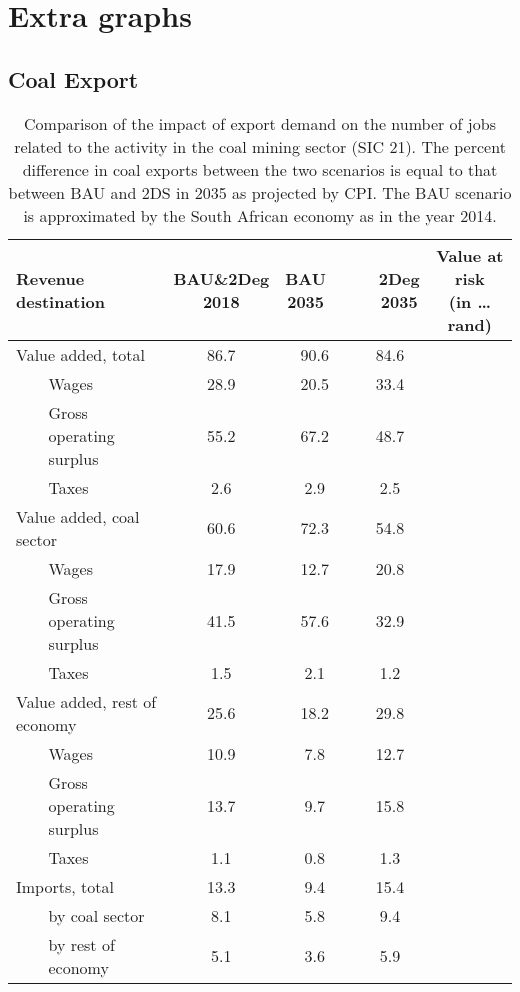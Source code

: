 \documentclass[12pt,english]{article}
\begin{document}
\section{Extra graphs}

\subsection{Coal Export}\label{coal export}

\begin{table}[ht]
	\centering
	\renewcommand*{\arraystretch}{1.15}
	\begin{tabular}{lp{20pt}lcccc}
		\toprule
		\multicolumn{3}{l}{Revenue destination } & \makecell{BAU\&2Deg \\2018} & \makecell{BAU\ \  \\ 2035\ \ } & \makecell{\ \ 2Deg \\\ \ 2035} & \makecell{Value at risk \\(in \ldots rand)}\\ 
		\midrule
		\multicolumn{3}{l}{Value added, total}   & 86.7  & 90.6 & 84.6 & \\ 	
		& 						 & Wages & 28.9 & 20.5  & 33.4 \\ 
		& 						 & Gross operating surplus & 55.2  &  67.2  & 48.7 &\\ 
		& 						 & Taxes & 2.6 &  2.9 & 2.5 & \\
		\midrule
		\multicolumn{3}{l}{Value added, coal sector}  & 60.6 & 72.3 & 54.8 \\ 
		& 						 & Wages & 17.9 &  12.7 & 20.8 \\ 
		& 						 & Gross operating surplus & 41.5 & 57.6  & 32.9 & \\ 
		& 						 & Taxes & 1.5 &  2.1 & 1.2 \\
		\midrule
		\multicolumn{3}{l}{Value added, rest of economy}  & 25.6  & 18.2 & 29.8 \\ 
		& 						 & Wages & 10.9 & 7.8  & 12.7 \\ 
		& 						 & Gross operating surplus & 13.7 &  9.7  & 15.8 & \\ 
		& 						 & Taxes & 1.1 & 0.8  & 1.3 \\
		\midrule
		\multicolumn{3}{l}{Imports, total}  		 & 13.3  & 9.4  & 15.4 & \\ 	
		& 						 & by coal sector & 8.1 &  5.8 & 9.4 & \\ 
		& 						 & by rest of economy & 5.1 &  3.6  & 5.9 & \\ 
		\bottomrule
	\end{tabular}
	\caption{\label{ExportRevenue_Decomposition_Diff_table}\small Comparison of the impact of export demand on the number of jobs related to the activity in the coal mining sector (SIC 21). The percent difference in coal exports between the two scenarios is equal to that between BAU and 2DS in 2035 as projected by CPI. The BAU scenario is approximated by the South African economy as in the year 2014.}
\end{table}
\end{document}
